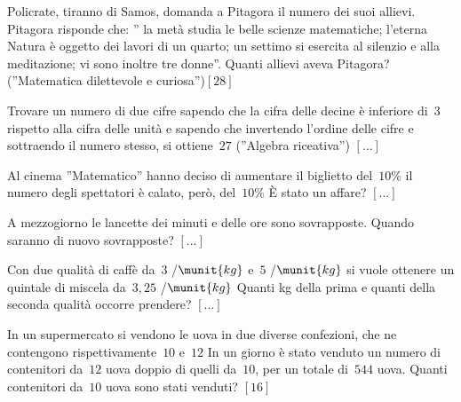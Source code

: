 \begin{htmulticols}{2}
\begin{esercizio}[*]
\label{ese:14.44}
Policrate, tiranno di Samos, domanda a Pitagora il numero dei suoi allievi. 
Pitagora risponde che: '' la metà studia le belle scienze matematiche; l'eterna 
Natura è oggetto dei lavori di un quarto; un settimo si esercita al silenzio e 
alla meditazione; vi sono inoltre tre donne''. Quanti allievi aveva Pitagora? 
(''Matematica dilettevole e curiosa'')\hfill \(\left[28\right]\)
\end{esercizio}

\begin{esercizio}
\label{ese:14.45}
Trovare un numero di due cifre sapendo che la cifra delle decine è inferiore 
di~\(3\) rispetto alla cifra delle unità e sapendo che invertendo l'ordine 
delle 
cifre e sottraendo il numero stesso, si ottiene~\(27\) (''Algebra riceativa'')
 \hfill \(\left[...\right]\)
\end{esercizio}

\begin{esercizio}
\label{ese:14.46}
Al cinema ''Matematico'' hanno deciso di aumentare il biglietto del~\(10 \%\) 
il 
numero degli spettatori è calato, però, del~\(10 \%\) È stato un affare?
 \hfill \(\left[...\right]\)
\end{esercizio}

\begin{esercizio}
\label{ese:14.47}
A mezzogiorno le lancette dei minuti e delle ore sono sovrapposte. Quando 
saranno di nuovo sovrapposte? \hfill \(\left[...\right]\)
\end{esercizio}

\begin{esercizio}
\label{ese:14.48}
Con due qualità di caffè da~\(3\) \officialeuro/\(\munit{kg}\) e~\(5\) 
\officialeuro/\(\munit{kg}\) si vuole ottenere un quintale di miscela 
da~\(3,25\) 
\officialeuro/\(\munit{kg}\) Quanti kg della prima e quanti della seconda 
qualità 
occorre prendere? \hfill \(\left[...\right]\)
\end{esercizio}

\begin{esercizio}[*]
\label{ese:14.49}
In un supermercato si vendono le uova in due diverse confezioni, che ne 
contengono rispettivamente~\(10\) e~\(12\) In un giorno è stato venduto un 
numero di 
contenitori da~\(12\) uova doppio di quelli da~\(10\), per un totale di~\(544\) 
uova. 
Quanti contenitori da~\(10\) uova sono stati venduti? \hfill \(\left[16\right]\)
\end{esercizio}


\end{htmulticols}
